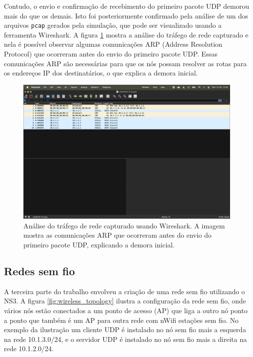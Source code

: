 \documentclass[12pt,a4paper]{article}
\begin{document}
Contudo, o envio e confirmação de recebimento do primeiro pacote UDP demorou mais do que os demais. Isto foi posteriormente confirmado pela análise de um dos arquivos \texttt{pcap} gerados pela simulação, que pode ser visualizado usando a ferramenta Wireshark. A figura \ref{fig:wireshark_analysis} mostra a análise do tráfego de rede capturado e nela é possível observar algumas comunicações ARP (Address Resolution Protocol) que ocorreram antes do envio do primeiro pacote UDP. Essas comunicações ARP são necessárias para que os nós possam resolver as rotas para os endereços IP dos destinatários, o que explica a demora inicial.

\begin{figure}
  \centering
  \includegraphics[width=1\textwidth]{wireshark_csma.png}
  \caption{Análise do tráfego de rede capturado usando Wireshark. A imagem mostra as comunicações ARP que ocorreram antes do envio do primeiro pacote UDP, explicando a demora inicial.}
  \label{fig:wireshark_analysis}
\end{figure}

\subsection{Redes sem fio}

A terceira parte do trabalho envolveu a criação de uma rede sem fio utilizando o NS3. A figura \ref{fig:wireless_topology} ilustra a configuração da rede sem fio, onde vários nós estão conectados a um ponto de acesso (AP) que liga a outro nó ponto a ponto que também é um AP para outra rede com nWifi estações sem fio. No exemplo da ilustração um cliente UDP é instalado no nó sem fio mais a esquerda na rede 10.1.3.0/24, e o servidor UDP é instalado no nó sem fio mais a direita na rede 10.1.2.0/24.
\end{document}
